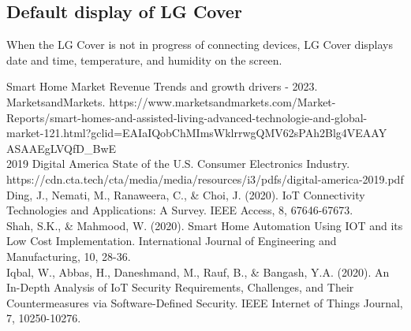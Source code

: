 \documentclass[conference]{IEEEtran}
\begin{document}
\begin{enumerate}[label=\arabic*.]
\begin{enumerate}[label=\alph*.]
\end{enumerate}

\end{enumerate}

\subsection{\large{Default display of LG Cover}}
When the LG Cover is not in progress of connecting devices, LG Cover displays date and time, temperature, and humidity on the screen.\\

\begin{thebibliography}{00}
 Smart Home Market Revenue Trends and growth drivers - 2023. MarketsandMarkets. https://www.marketsandmarkets.com/Market-Reports/smart-homes-and-assisted-living-advanced-technologie-and-global-market-121.html?gclid=EAIaIQobChMImsWklrrwgQMV62sPAh2Blg4VEAAY\\ASAAEgLVQfD\_BwE \\
 2019 Digital America State of the U.S. Consumer Electronics Industry. https://cdn.cta.tech/cta/media/media/resources/i3/pdfs/digital-america-2019.pdf \\
 Ding, J., Nemati, M., Ranaweera, C., \& Choi, J. (2020). IoT Connectivity Technologies and Applications: A Survey. IEEE Access, 8, 67646-67673.\\
 Shah, S.K., \& Mahmood, W. (2020). Smart Home Automation Using IOT and its Low Cost Implementation. International Journal of Engineering and Manufacturing, 10, 28-36.\\
 Iqbal, W., Abbas, H., Daneshmand, M., Rauf, B., \& Bangash, Y.A. (2020). An In-Depth Analysis of IoT Security Requirements, Challenges, and Their Countermeasures via Software-Defined Security. IEEE Internet of Things Journal, 7, 10250-10276.
\end{thebibliography}
\end{document}
